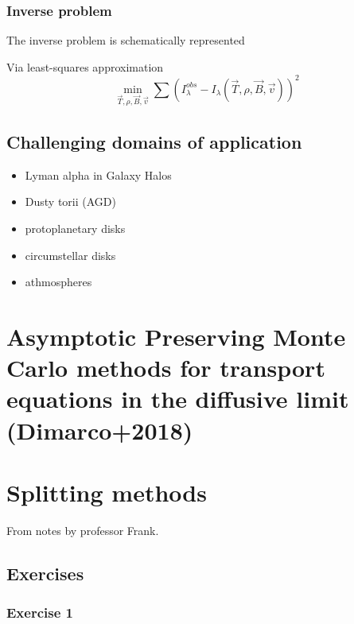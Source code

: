 \documentclass[../main/main.tex]{subfiles}
\begin{document}
\noindent{}

\subsubsection*{Inverse problem}
The inverse problem is schematically represented
\begin{center}
\end{center}
Via least-squares approximation
\begin{equation}
\min_{\vec{T},\rho,\vec{B},\vec{v}} \sum \left( I_{\lambda}^{obs} - I_\lambda(\vec{T},\rho,\vec{B},\vec{v}) \right)^2
\end{equation}

\subsection{Challenging domains of application}
\begin{itemize}
\item Lyman alpha in Galaxy Halos
\item Dusty torii (AGD)
\item protoplanetary disks
\item circumstellar disks
\item athmospheres
\end{itemize}

\section{Asymptotic Preserving Monte Carlo methods for transport equations in the diffusive limit (Dimarco+2018)}

\section{Splitting methods}
From notes by professor Frank.
\subsection{Exercises}
\subsubsection{Exercise 1}
\end{document}
